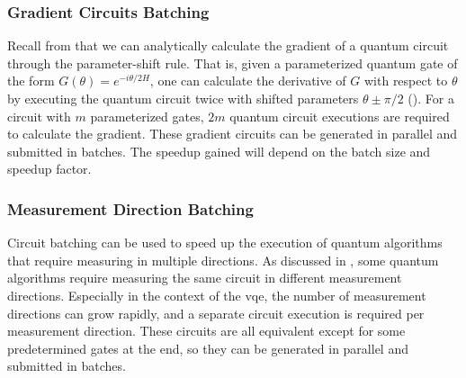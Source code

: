 \subsubsection{Gradient Circuits Batching}
Recall from  that we can analytically calculate the gradient of a quantum circuit through the parameter-shift rule.
That is, given a parameterized quantum gate of the form $G(\theta) = e^{-i\theta/2 H}$, one can calculate the derivative of $G$ with respect to $\theta$ by executing the quantum circuit twice with shifted parameters $\theta \pm \pi/2$ ().
For a circuit with $m$ parameterized gates, $2m$ quantum circuit executions are required to calculate the gradient.
These gradient circuits can be generated in parallel and submitted in batches.
The speedup gained will depend on the batch size and speedup factor.

\subsubsection{Measurement Direction Batching}
Circuit batching can be used to speed up the execution of quantum algorithms that require measuring in multiple directions.
As discussed in , some quantum algorithms require measuring the same circuit in different measurement directions.
Especially in the context of the \gls{vqe}, the number of measurement directions can grow rapidly, and a separate circuit execution is required per measurement direction.
These circuits are all equivalent except for some predetermined gates at the end, so they can be generated in parallel and submitted in batches.

